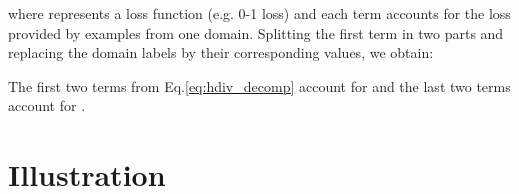 \documentclass{article}
\begin{document}
 
where  represents a loss function (e.g. 0-1 loss) and each term accounts for the loss provided by examples from one domain. Splitting the first term in two parts and replacing the domain labels  by their corresponding values, we obtain:


The first two terms from Eq.\ref{eq:hdiv_decomp} account for  and the last two terms account for .

\section{Illustration}
 \begin{figure}[h]
\centering
\resizebox{0.4\columnwidth}{5cm}{

\begin{tikzpicture}[x=0.75pt,y=0.75pt,yscale=-1,xscale=1]


\end{tikzpicture}}
\end{figure}
\end{document}
